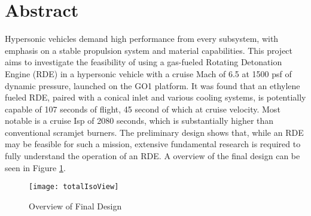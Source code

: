 \section{Abstract}
Hypersonic vehicles demand high performance from every subsystem, with emphasis on a stable propulsion system and material capabilities. This project aims to investigate the feasibility of using a gas-fueled Rotating Detonation Engine (RDE) in a hypersonic vehicle with a cruise Mach of 6.5 at 1500 psf of dynamic pressure, launched on the GO1 platform. It was found that an ethylene fueled RDE, paired with a conical inlet and various cooling systems, is potentially capable of 107 seconds of flight, 45 second of which at cruise velocity. Most notable is a cruise Isp of 2080 seconds, which is substantially higher than conventional scramjet burners. The preliminary design shows that, while an RDE may be feasible for such a mission, extensive fundamental research is required to fully understand the operation of an RDE. A overview of the final design can be seen in Figure \ref{fig:totalIsoView}.

 \begin{figure}[H]
\begin{center}
\texttt{[image: totalIsoView]}
\caption{Overview of Final Design}
\label{fig:totalIsoView}
\end{center}
\end{figure}